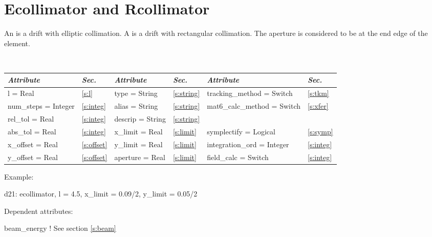 \section{Ecollimator and Rcollimator}
\label{s:col}

An  is a drift with elliptic collimation.
A  is a drift with rectangular collimation.
The aperture is considered to be at the end edge of the element.

\toffset
\begin{center}
\tt
\begin{tabular}{|l|l||l|l||l|l|} \hline
  {\sl Attribute} & {\sl Sec.}  & {\sl Attribute} & {\sl Sec.} & {\sl Attribute} & {\sl Sec.} \\ \hline
  l        = Real       & \ref{s:l}      & type = String                & \ref{s:string} & tracking\_method = Switch    & \ref{s:tkm}   \\ \hline
  num\_steps = Integer  & \ref{s:integ}  & alias = String               & \ref{s:string} & mat6\_calc\_method = Switch  & \ref{s:xfer}  \\ \hline
  rel\_tol = Real       & \ref{s:integ}  & descrip = String             & \ref{s:string} &                              &               \\ \hline
  abs\_tol = Real       & \ref{s:integ}  & x\_limit = Real              & \ref{s:limit}  & symplectify = Logical        & \ref{s:symp}  \\ \hline
  x\_offset  = Real     & \ref{s:offset} & y\_limit = Real              & \ref{s:limit}  & integration\_ord = Integer   & \ref{s:integ} \\ \hline
  y\_offset  = Real     & \ref{s:offset} & aperture = Real              & \ref{s:limit}  & field\_calc = Switch         & \ref{s:integ} \\ \hline                                
\end{tabular}
\end{center}
\toffset

\vskip0.05in \noindent
Example:
\begin{example}
  d21: ecollimator, l = 4.5, x_limit = 0.09/2, y_limit = 0.05/2
\end{example}

\vskip0.05in \noindent
Dependent attributes:
\begin{example}
  beam\_energy  ! See section \ref{s:beam}
\end{example}

